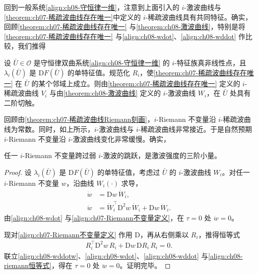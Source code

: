 \documentclass[../../main.tex]{subfiles}
\begin{document}
回到一般系统\eqref{align:ch08-守恒律一维}，注意到上面引入的 $i$-激波曲线与\cref{theorem:ch07-稀疏波曲线存在唯一}中定义的 $i$-稀疏波曲线具有共同特征。确实，回顾\cref{theorem:ch07-稀疏波曲线存在唯一} 与\cref{theorem:ch08-激波曲线}，特别是将\cref{theorem:ch07-稀疏波曲线存在唯一} 与\eqref{align:ch08-wdot}、\eqref{align:ch08-wddot} 作比较，我们推得

\begin{theorem}[激波曲线与稀疏波曲线的二阶切触]\label{theorem:ch08-二阶切触}
设 $\bar U\in\mathcal O$ 是守恒律双曲系统\eqref{align:ch08-守恒律一维} 的 $i$-特征族真非线性点，且 $\lambda_i(\bar U)$ 是 $\mathrm{D}F(\bar U)$ 的单特征值。规范化 $R_i$，使\cref{theorem:ch07-稀疏波曲线存在唯一} 在 $\bar U$ 的某个邻域上成立。则由\cref{theorem:ch07-稀疏波曲线存在唯一} 定义的 $i$-稀疏波曲线 $V_i$ 与由\cref{theorem:ch08-激波曲线} 定义的 $i$-激波曲线 $W_i$，在 $\bar U$ 处具有二阶切触。
\end{theorem}

回顾由\cref{theorem:ch07-稀疏波曲线Riemann刻画}，$i$-Riemann 不变量沿 $i$-稀疏波曲线为常数。同时，如上所示，$i$-激波曲线与 $i$-稀疏波曲线非常接近。于是自然预期 $i$-Riemann 不变量沿 $i$-激波曲线变化非常缓慢。确实，

\begin{theorem}\label{theorem:ch08-riemann三阶}
任一 $i$-Riemann 不变量跨过弱 $i$-激波的跳跃，是激波强度的三阶小量。
\end{theorem}

\begin{proof}
设 $\lambda_i(\bar U)$ 是 $\mathrm{D}F(\bar U)$ 的单特征值，考虑过 $\bar U$ 的 $i$-激波曲线 $W_i$。对任一 $i$-Riemann 不变量 $w$，沿曲线 $W_i(\cdot)$ 求导，
\begin{align}
\dot w&=\mathrm{D}w\,\dot W_i,
\label{align:ch08-wdotw}\\
\ddot w&=\dot W_i^{\top}\mathrm{D}^2 w\,\dot W_i+\mathrm{D}w\,\ddot W_i.
\label{align:ch08-wddotw}
\end{align}
由\eqref{align:ch08-wdot} 与\eqref{align:ch07-Riemann不变量定义}，在 $\tau=0$ 处 $\dot w=0$。

现对\eqref{align:ch07-Riemann不变量定义} 作用 $\mathrm{D}$，再从右侧乘以 $R_i$，推得恒等式
\begin{align}
R_i^{\top}\mathrm{D}^2 w\,R_i+\mathrm{D}w\,\mathrm{D}R_i\,R_i=0.
\label{align:ch08-riemann恒等式}
\end{align}
联立\eqref{align:ch08-wddotw}、\eqref{align:ch08-wdot}、\eqref{align:ch08-wddot} 与\eqref{align:ch08-riemann恒等式}，得在 $\tau=0$ 处 $\ddot w=0$。证明完毕。
\end{proof}
\end{document}
